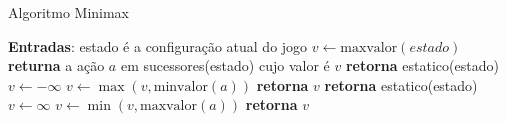 \documentclass[a4paper,10pt]{article} %
\begin{document}
\begin{algorithm}
\caption{Algoritmo Minimax}\label{alg:minimax}
\begin{algorithmic}[1]
\State \textbf{Entradas}: estado é a configuração atual do jogo
\State $v\gets \mathrm{maxvalor}{(estado)}$
\State \textbf{returna} a ação $a$ em sucessores(estado) cujo valor é $v$ %
\EndFunction
{}
   \State \textbf{retorna} estatico(estado)
\EndIf
\State $v \gets -\infty$
    \State $v \gets \max{(v, \mathrm{minvalor}(a))}$
\EndFor
\State \textbf{retorna} $v$
\EndFunction
{}
   \State \textbf{retorna} estatico(estado)
\EndIf
\State $v \gets \infty$
    \State $v \gets \min{(v, \mathrm{maxvalor}(a))}$
\EndFor
\State \textbf{retorna} $v$
\EndFunction
\end{algorithmic}
\end{algorithm}
\end{document}
